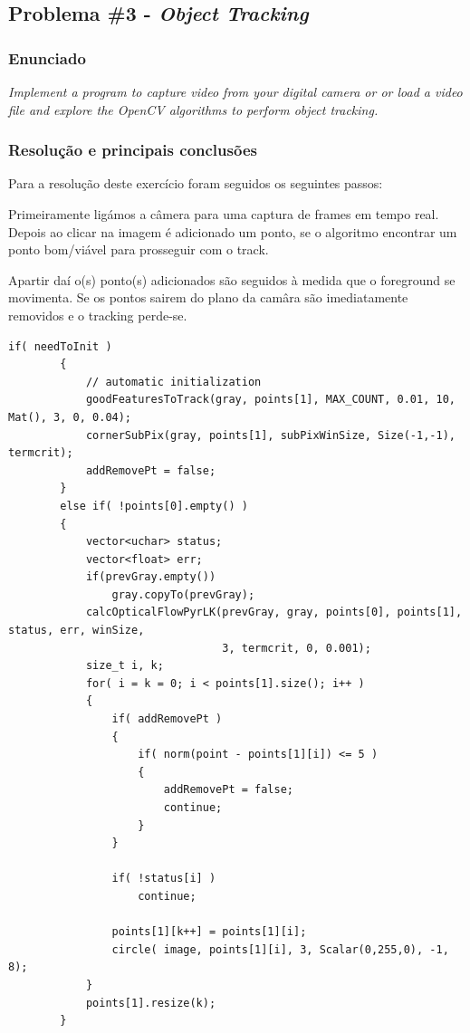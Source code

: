 \documentclass[portuguese, times, mirror]{revdetua}
\begin{document}


\subsection{Problema \#3 - \textit{Object Tracking}}


\subsubsection{Enunciado}
\textit{Implement a program to capture video from your digital camera or or load a video file and explore
the OpenCV algorithms to perform object tracking. }

\subsubsection{Resolução e principais conclusões}

Para a resolução deste exercício foram seguidos os seguintes passos: 

Primeiramente ligámos a câmera para uma captura de frames em tempo real. Depois ao clicar na imagem é adicionado um ponto, se o algoritmo encontrar um ponto bom/viável para prosseguir com o track.

Apartir daí o(s) ponto(s) adicionados são seguidos à medida que o foreground se movimenta. Se os pontos sairem do plano da camâra são imediatamente removidos e o tracking perde-se.


\begin{lstlisting}[caption=Excerto de código,label=code:C]
if( needToInit )
        {
            // automatic initialization
            goodFeaturesToTrack(gray, points[1], MAX_COUNT, 0.01, 10, Mat(), 3, 0, 0.04);
            cornerSubPix(gray, points[1], subPixWinSize, Size(-1,-1), termcrit);
            addRemovePt = false;
        }
        else if( !points[0].empty() )
        {
            vector<uchar> status;
            vector<float> err;
            if(prevGray.empty())
                gray.copyTo(prevGray);
            calcOpticalFlowPyrLK(prevGray, gray, points[0], points[1], status, err, winSize,
                                 3, termcrit, 0, 0.001);
            size_t i, k;
            for( i = k = 0; i < points[1].size(); i++ )
            {
                if( addRemovePt )
                {
                    if( norm(point - points[1][i]) <= 5 )
                    {
                        addRemovePt = false;
                        continue;
                    }
                }

                if( !status[i] )
                    continue;

                points[1][k++] = points[1][i];
                circle( image, points[1][i], 3, Scalar(0,255,0), -1, 8);
            }
            points[1].resize(k);
        }
\end{lstlisting}
\end{document}

